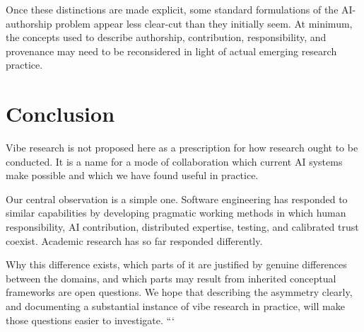 Once these distinctions are made explicit, some standard formulations of the AI-authorship problem appear less clear-cut than they initially seem. At minimum, the concepts used to describe authorship, contribution, responsibility, and provenance may need to be reconsidered in light of actual emerging research practice.


\section{Conclusion}

Vibe research is not proposed here as a prescription for how research ought to be conducted. It is a name for a mode of collaboration which current AI systems make possible and which we have found useful in practice.

Our central observation is a simple one. Software engineering has responded to similar capabilities by developing pragmatic working methods in which human responsibility, AI contribution, distributed expertise, testing, and calibrated trust coexist. Academic research has so far responded differently.

Why this difference exists, which parts of it are justified by genuine differences between the domains, and which parts may result from inherited conceptual frameworks are open questions. We hope that describing the asymmetry clearly, and documenting a substantial instance of vibe research in practice, will make those questions easier to investigate.
```
